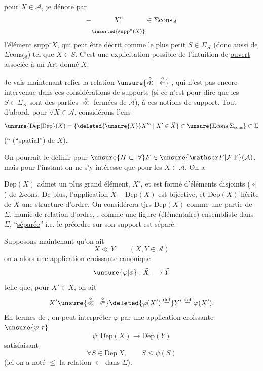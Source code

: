   pour $X\in\mathcal A$, je dénote par
\[
-\underset{\substack{\Vert\\\inserted{\mathrm{supp}^{\circ}(X)}}}{X^{\circ}}\in\Sigma\mathrm{cons}_{\mathcal A}
\]
l'élément $\mathrm{supp}^{\circ}X$, qui peut être décrit comme le plus petit $S\in\Sigma_{\mathcal A}$ (donc aussi de $\Sigma\mathrm{cons}_{\mathcal A}$) tel que $X\in S$. C'est une explicitation possible de l'intuition de  \uline{ ouvert} associée à un Art donné $X$.

Je vais maintenant relier la relation $\unsure{\overset{\circ}{\ll}|\overset{\circ}{\Subset}}$ , qui n'est pas encore intervenue dans ces considérations de supports (si ce n'est pour dire que les $S\in\Sigma_{\mathcal A}$ sont des parties $\overset{\circ}{\ll}$-fermées de $\mathcal A$), à ces notions de support. Tout d'abord, pour $\forall X\in\mathcal A$, considérons  l'ens
\[
\unsure{\mathrm{Dep}|\mathrm{D\acute{e}p}}(X)=\{\deleted{\unsure{X}}X^{\prime\circ}\mid X'\in\widetilde X\}\subset\unsure{\Sigma\mathrm{cons}|\Sigma_{\mathrm{cons}}}\subset\Sigma
\]
(``\uline{} (``spatial'') de $X$).

On pourrait le définir pour $\unsure{H\subset|\forall}F\in\unsure{\mathscr F|\mathcal F|\mathbb F}(\mathcal A)$, mais pour l'instant on ne s'y intéresse que pour les $X\in\mathcal A$. On a

$\mathrm{Dep}(X)$ admet un plus grand élément, $X^{\circ}$, et est formé d'éléments \inserted{$\ne\varnothing_\Sigma$,}  disjoints ($\mathrel{|\circ|}$) de $\Sigma\mathrm{cons}$. De plus, l'application $\widetilde X\mathbin{-}\mathrm{Dep}(X)$ est bijective, et $\mathrm{Dep}(X)$ hérite de $\widetilde X$ une structure d'ordre. On considérera tjrs $\mathrm{Dep}(X)$ comme une partie de $\Sigma$, munie de   relation d'ordre, , comme une figure (élémentaire) ensembliste dans $\Sigma$, ``\uline{séparée}'' i.e. le préordre sur son support est séparé.

Supposons maintenant qu'on ait
\[
X\ll Y\qquad (X,Y\in\mathcal A)
\]
on a alors une application croissante canonique
\[
\unsure{\varphi|\phi}:\widetilde X\longrightarrow\widetilde Y
\]
telle que, pour  $X'\in\widetilde X$, on ait
\[
X'\unsure{\overset{\circ}{\ll}|\overset{\circ}{\Subset}}\deleted{\varphi(X')\overset{\mathrm{def}}{=}}Y'\overset{\mathrm{def}}{=}\varphi(X').
\]
En termes de , on peut interpréter $\varphi$ par une application croissante $\unsure{\psi|\tau}$
\[
\psi:\mathrm{D\acute{e}p}(X)\longrightarrow\mathrm{D\acute{e}p}(Y)
\]
satisfaisant
\[
\forall S\in\mathrm{D\acute{e}p}\,X,\qquad S\leq\psi(S)
\]
(ici on a noté $\leq$ la relation $\subset$ dans $\Sigma$).

